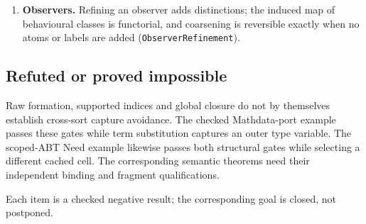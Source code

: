 \documentclass[11pt]{article}
\theoremstyle{definition}
\theoremstyle{remark}
\begin{document}
\begin{enumerate}
  determines the equations, the equations determine behavioural equivalence
  under every observer and equality in every model, fine behavioural
  equivalence determines coarse, occurrence identity erases to endpoints, and
  lineage determines reachability only (\texttt{IdentityNotions}).  A family
  descends through an observer exactly when it is invariant under that
  observer's behavioural equivalence (\nolinkurl{descendsThrough_iff}).
\item \textbf{Observers.}  Refining an observer adds distinctions; the induced
  map of behavioural classes is functorial, and coarsening is reversible
  exactly when no atoms or labels are added (\texttt{ObserverRefinement}).
\end{enumerate}

\subsection{Refuted or proved impossible}

Raw formation, supported indices and global closure do not by themselves
establish cross-sort capture avoidance. The checked Mathdata-port example
passes these gates while term substitution captures an outer type variable.
The scoped-ABT Need example likewise passes both structural gates while
selecting a different cached cell. The corresponding semantic theorems need
their independent binding and fragment qualifications.

Each item is a checked negative result; the corresponding goal is closed, not
postponed.
\end{document}
